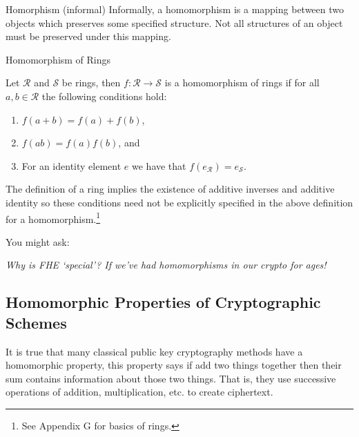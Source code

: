 \begin{defn}{Homorphism (informal)}
    Informally, a homomorphism is a mapping between two objects which preserves some specified structure. Not all structures of an object must be preserved under this mapping.
    
\end{defn}


\begin{defn}{Homomorphism of Rings}
    
    Let $\mathcal{R}$ and $\mathcal{S}$ be rings, then $f: \mathcal{R} \rightarrow \mathcal{S}$ is a homomorphism of rings if for all $a,b \in \mathcal{R}$ the following conditions hold:
    
    \begin{enumerate}
        \item $f(a+b) = f(a)+f(b)$,
        \item $f(ab)=f(a)f(b)$, and
        \item For an identity element $e$ we have that $f(e_{\mathcal{R}}) = e_{\mathcal{S}}$.
    \end{enumerate}
    
\end{defn}

\begin{nt}
    The definition of a ring implies the existence of additive inverses and additive identity so these conditions need not be explicitly specified in the above definition for a homomorphism.\footnote{See Appendix G for basics of rings.}
\end{nt}


You might ask:

\textit{Why is FHE `special'? If we've had homomorphisms in our crypto for ages!}



    
    
    
    


\subsection{Homomorphic Properties of Cryptographic Schemes} 

It is true that many classical public key cryptography methods have a homomorphic property, this property says if add two things together then their sum contains information about those two things.
That is, they use successive operations of addition, multiplication, etc. to create ciphertext. 

